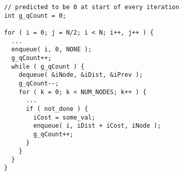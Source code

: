 \begin{lstlisting}[morekeywords={g_qCount},belowskip=0pt]
// predicted to be 0 at start of every iteration
int g_qCount = 0;

for ( i = 0; j = N/2; i < N; i++, j++ ) {
  ...
  enqueue( i, 0, NONE );
  g_qCount++;
  while ( g_qCount ) {
    dequeue( &iNode, &iDist, &iPrev );
    g_qCount--;
    for ( k = 0; k < NUM_NODES; k++ ) {
      ...
      if ( not_done ) {
        iCost = some_val;
        enqueue( i, iDist + iCost, iNode );
        g_qCount++;
      }
    }
  }
}

\end{lstlisting}
